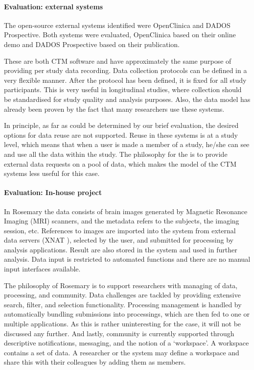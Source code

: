 \paragraph{Evaluation: external systems}
The open-source external systems identified were OpenClinica and DADOS Prospective.
Both systems were evaluated, OpenClinica based on their online demo and DADOS Prospective based on their publication.

These are both CTM software and have approximately the same purpose of providing per study data recording.
Data collection protocols can be defined in a very flexible manner.
After the protocol has been defined, it is fixed for all study participants.
This is very useful in longitudinal studies, where collection should be standardised for study quality and analysis purposes.
Also, the data model has already been proven by the fact that many researchers use these systems.

In principle, as far as could be determined by our brief evaluation, the desired options for data reuse are not supported.
Reuse in these systems is at a study level, which means that when a user is made a member of a study, he/she can see and use all the data within the study.
The philosophy for the \ivfsystem{} is to provide external data requests on a pool of data, which makes the model of the CTM systems less useful for this case.

\paragraph{Evaluation: In-house project}
In Rosemary the data consists of brain images generated by Magnetic Resonance Imaging (MRI) scanners, and the metadata refers to the subjects, the imaging session, etc. 
References to images are imported into the system from external data servers (XNAT \cite{xnat}), selected by the user, and submitted for processing by analysis applications. 
Result are also stored in the system and used in further analysis.
Data input is restricted to automated functions and there are no manual input interfaces available.

The philosophy of Rosemary is to support researchers with managing of data, processing, and community.
Data challenges are tackled by providing extensive search, filter, and selection functionality.
Processing management is handled by automatically bundling submissions into processings, which are then fed to one or multiple applications. As this is rather uninteresting for the \ivfsystem{} case, it will not be discussed any further.
And lastly, community is currently supported through descriptive notifications, messaging, and the notion of a `workspace'.
A workspace contains a set of data. A researcher or the system may define a workspace and share this with their colleagues by adding them as members.

